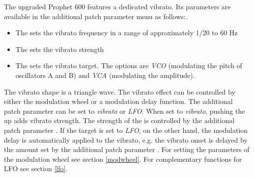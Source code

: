 The upgraded Prophet 600 features a dedicated vibrato. Its parameters are available in the additional patch parameter menu as follows:.

\begin{itemize}
  \item The \vibspeed sets the vibrato frequency in a range of approximately 1/20 to 60 Hz
  \item The \vibamt sets the vibrato strength
  \item The \vibtgt sets the vibrato target. The options are \textit{VCO} (modulating the pitch of oscillators A  and B) and \textit{VCA} (modulating the amplitude). 
\end{itemize}

The vibrato shape is a triangle wave. The vibrato effect can be controlled by either the modulation wheel or a modulation delay function. The additional patch parameter \modwheeltarget can be set to \textit{vibrato} or \textit{LFO}. When set to \textit{vibrato}, pushing the \modwheel up adds vibrato strength. The strength of the \modwheel is controlled by the additional patch parameter \modwheelrange. If the \modwheel target is set to \textit{LFO}, on the other hand, the modulation delay is automatically applied to the vibrato, e.g. the vibrato onset is delayed by the amount set by the additional patch parameter \moddelay. For setting the parameters of the modulation wheel see section \ref{modwheel}. For complementary functions for LFO see section \ref{lfo}.

